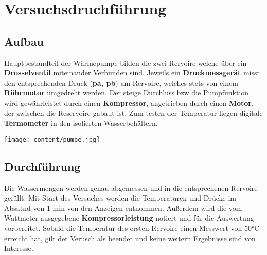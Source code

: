 \section{Versuchsdruchführung}
\label{sec:Versuchsdruchführung}





\noindent\begin{minipage}{0.5\textwidth}
\subsection{Aufbau}
\label{sec:Aufbau}
Hauptbestandteil der Wärmepumpe bilden die zwei Rervoire welche über ein  \\
\textbf{Drosselventil} miteinander Verbunden sind. Jeweils ein \textbf{Druckmessgerät} misst 
den entsprechenden Druck (\textbf{pa, pb}) am Rervoire, welches stets von einem \textbf{Rührmotor} umgedreht werden.
Der steige Durchluss bzw die Pumpfunktion wird gewährleistet durch einen \textbf{Kompressor}, angetrieben durch einen \textbf{Motor},
 der zwischen die Reservoire gabaut ist. Zum testen der Temperatur liegen digitale 
\textbf{Termometer} in den isolierten Wasserbehältern.
\end{minipage}
\hfill
\begin{minipage}{0.5\textwidth}\raggedleft
\vspace{2cm}
\texttt{[image: content/pumpe.jpg]}

\end{minipage}


\subsection{Durchführung}
\label{sec:Durchfuehrung}
Die Wassermengen werden genau abgemessen und in die entsprechenen Rervoire gefüllt. 
Mit Start des Versuches werden die Temperaturen und Drücke im Absatnd von 1 min von den Anzeigen entnommen. Außerdem wird die vom Wattmeter ausgegebene \textbf{Kompressorleistung} notiert und für 
die Auswertung vorbereitet. Sobald die Temperatur des ersten Rervoire einen Messwert von 50°C erreicht hat, gilt der Verusch als beendet und keine weitern Ergebnisse sind von Interesse.
